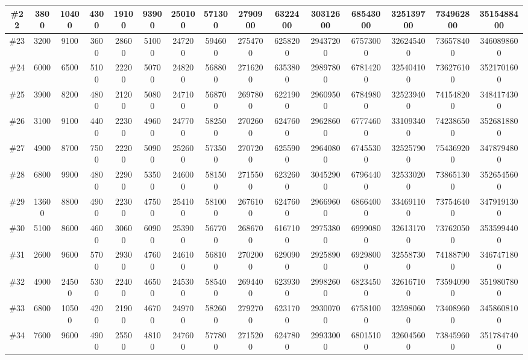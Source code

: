 \documentclass[titlepage]{article}
\begin{document}
\begin{landscape}
\begin{table}[h]
\begin{tabular}{|c|c|c|c|c|c|c|c|c|c|c|c|c|c|c|}
			\hline
			\#22     & 3800   & 10400 & 4300  & 19100 & 93900 & 250100 & 571300 & 2790900 & 6322400 & 30312600 & 68543000 & 325139700 & 734962800 & 3515488400  \\ 
			\hline
			\#23     & 3200   & 9100  & 3600  & 28600 & 51000 & 247200 & 594600 & 2754700 & 6258200 & 29437200 & 67573000 & 326245400 & 736578400 & 3460898600  \\ 
			\hline
			\#24     & 6000   & 6500  & 5100  & 22200 & 50700 & 248200 & 568800 & 2716200 & 6353800 & 29897800 & 67814200 & 325404100 & 736276100 & 3521701600  \\ 
			\hline
			\#25     & 3900   & 8200  & 4800  & 21200 & 50800 & 247100 & 568700 & 2697800 & 6221900 & 29609500 & 67849800 & 325239400 & 741548200 & 3484174300  \\ 
			\hline
			\#26     & 3100   & 9100  & 4400  & 22300 & 49600 & 247700 & 582500 & 2702600 & 6247600 & 29628600 & 67774600 & 331093400 & 742386500 & 3526818800  \\ 
			\hline
			\#27     & 4900   & 8700  & 7500  & 22200 & 50900 & 252600 & 573500 & 2707200 & 6255900 & 29640800 & 67455300 & 325257900 & 754369200 & 3478794800  \\ 
			\hline
			\#28     & 6800   & 9900  & 4800  & 22900 & 53500 & 246000 & 581500 & 2715500 & 6232600 & 30452900 & 67964400 & 325330200 & 738651300 & 3526545600  \\ 
			\hline
			\#29     & 13600  & 8800  & 4900  & 22300 & 47500 & 254100 & 581000 & 2676100 & 6247600 & 29669600 & 68664000 & 334691100 & 737546400 & 3479191300  \\ 
			\hline
			\#30     & 5100   & 8600  & 4600  & 30600 & 60900 & 253900 & 567700 & 2686700 & 6167100 & 29753800 & 69990800 & 326131700 & 737620500 & 3535994400  \\ 
			\hline
			\#31     & 2600   & 9600  & 5700  & 29300 & 47600 & 246100 & 568100 & 2702000 & 6290900 & 29258900 & 69298000 & 325587300 & 741887900 & 3467471800  \\ 
			\hline
			\#32     & 4900   & 24500 & 5300  & 22400 & 46500 & 245300 & 585400 & 2694400 & 6239300 & 29982600 & 68234500 & 326167100 & 735940900 & 3519807800  \\ 
			\hline
			\#33     & 6800   & 10500 & 4200  & 21900 & 46700 & 249700 & 582600 & 2792700 & 6231700 & 29300700 & 67581000 & 325980600 & 734089600 & 3458608100  \\ 
			\hline
			\#34     & 7600   & 9600  & 4900  & 25500 & 48100 & 247600 & 577800 & 2715200 & 6247800 & 29933000 & 68015100 & 326045600 & 738459600 & 3517847400  \\ 

\end{tabular}
\end{table}
\end{landscape}
\end{document}
